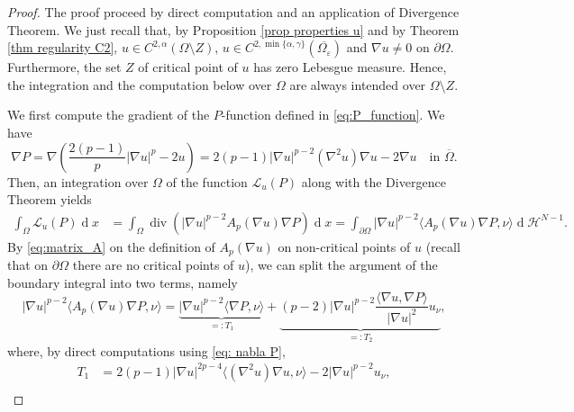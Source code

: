 \documentclass[10pt,a4paper, reqno]{amsart}
\numberwithin{equation}{section}
\renewcommand{\div}{\operatorname{div}}
\renewcommand{\d}[1]{\ensuremath{\operatorname{d}\!{#1}}}
\begin{document}
\begin{proof}
    The proof proceed by direct computation and an application of Divergence Theorem. We just recall that, by Proposition \ref{prop properties u} and by Theorem \ref{thm regularity C2}, $u \in C^{2,\alpha}(\Omega\setminus Z)$, $u \in C^{2,\min \{ \alpha,\gamma \}}(\overline{\Omega_\varepsilon})$ and $\nabla u \neq 0$ on $\partial\Omega$. Furthermore, the set $Z$ of critical point of $u$ has zero Lebesgue measure. Hence, the integration and the computation below over $\Omega$ are always intended over $\Omega \setminus Z$. 
    
    We first compute the gradient of the $P$-function defined in \eqref{eq:P_function}. We have
    \begin{equation}\label{eq: nabla P}
        \nabla P = \nabla \left( \frac{2(p-1)}{p}|\nabla u|^p - 2u \right) = 2(p-1)|\nabla u|^{p-2}(\nabla^2 u)\nabla u - 2\nabla u \quad \text{in } \overline{\Omega}.
    \end{equation}
    Then, an integration over $\Omega$ of the function $ \mathcal{L}_u(P)$ along with the Divergence Theorem yields
    \begin{equation} \label{eq:integral_L_P}
        \begin{aligned}
        \int_\Omega \mathcal{L}_u(P) \d{x} &= \int_\Omega \div \left( |\nabla u|^{p-2} A_p(\nabla u)\nabla P \right) \d{x} = \int_{\partial\Omega} |\nabla u|^{p-2} \langle A_p(\nabla u)\nabla P, \nu \rangle \d{}\mathcal{H}^{N-1}.
        \end{aligned}
    \end{equation}
    By \eqref{eq:matrix_A} on the definition of $A_p(\nabla u)$ on non-critical points of $u$ (recall that on $\partial\Omega$ there are no critical points of $u$), we can split the argument of the boundary integral into two terms, namely
    \begin{equation*}
        |\nabla u|^{p-2} \langle A_p(\nabla u)\nabla P, \nu \rangle = \underbrace{|\nabla u|^{p-2} \langle \nabla P, \nu \rangle}_{=:T_1} + \underbrace{(p-2) |\nabla u|^{p-2} \frac{\langle \nabla u, \nabla P \rangle}{|\nabla u|^2} u_\nu}_{=:T_2},
    \end{equation*}
    where, by direct computations using \eqref{eq: nabla P},
    \begin{equation*}
        \begin{aligned}
        T_1 &= 2(p-1)|\nabla u|^{2p-4}\langle (\nabla^2 u)\nabla u, \nu \rangle - 2|\nabla u|^{p-2} u_\nu, 
        \\

\end{aligned}
\end{equation*}
\end{proof}
\end{document}
